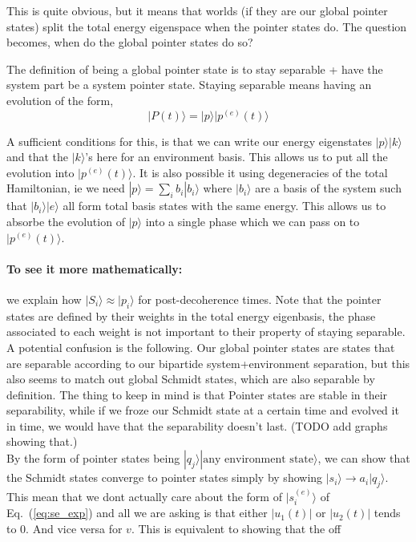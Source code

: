 \documentclass{article}
\begin{document}
This is quite obvious, but it means that worlds (if they are our global pointer states) split the total energy eigenspace when the pointer states do. The question becomes, when do the global pointer states do so? 

The definition of being a global pointer state is to stay separable + have the system part be a system pointer state.
Staying separable means having an evolution of the form, 
\begin{equation}
    |P(t)\rangle=|p\rangle|p^{(e)}(t)\rangle
\end{equation}

A sufficient conditions for this, is that we can write our energy eigenstates $|p\rangle|k\rangle$ and that the $|k\rangle$'s here for an environment basis. This allows us to put all the evolution into $|p^{(e)}(t)\rangle$. It is also possible it using degeneracies of the total Hamiltonian, ie we need $|p\rangle=\sum_ib_i|b_i\rangle$ where $|b_i\rangle$ are a basis of the system such that $|b_i\rangle|e\rangle$ all form total basis states with the same energy. This allows us to absorbe the evolution of $|p\rangle$ into a single phase which we can pass on to $|p^{(e)}(t)\rangle$.

\paragraph{To see it more mathematically:} we explain how $|S_i\rangle\approx|p_i\rangle$ for post-decoherence times. Note that the pointer states are defined by their weights in the total energy eigenbasis, the phase associated to each weight is not important to their property of staying separable.\\

A potential confusion is the following. Our global pointer states are states that are separable according to our bipartide system+environment separation, but this also seems to match out global Schmidt states, which are also separable by definition. The thing to keep in mind is that Pointer states are stable in their separability, while if we froze our Schmidt state at a certain time and evolved it in time, we would have that the separability doesn't last. (TODO add graphs showing that.)\\

By the form of pointer states being $|q_j\rangle|\text{any environment state}\rangle$, we can show that the Schmidt states converge to pointer states simply by showing $|s_i\rangle\rightarrow a_i|q_j\rangle$. This mean that we dont actually care about the form of $|s^{(e)}_i\rangle$ of Eq.~(\ref{eq:se_exp}) and all we are asking is that either $|u_1(t)|$ or $|u_2(t)|$ tends to 0. And vice versa for $v$. This is equivalent to showing that the off
\end{document}
